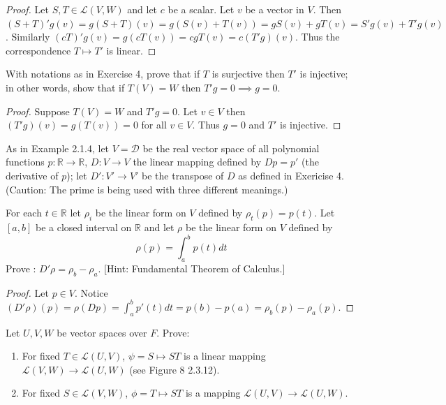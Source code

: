 \begin{proof}
    Let $S, T \in \mathcal{L}(V, W)$ and let $c$ be a scalar.
    Let $v$ be a vector in $V$.
    Then $(S + T)'g(v) = g(S + T)(v) = g(S(v) + T(v)) = gS(v) + gT(v) = S'g(v) + T'g(v)$.
    Similarly $(cT)'g(v) = g(cT(v)) = cgT(v) = c(T'g)(v)$.
    Thus the correspondence $T \mapsto T'$ is linear.
\end{proof}

\begin{tcolorbox}[title=Problem 6, breakable]
    With notations as in Exercise 4, prove that if $T$
    is surjective then $T'$ is injective; in other words,
    show that if $T(V) = W$ then $T'g = 0 \implies g = 0$.
\end{tcolorbox}

\begin{proof}
    Suppose $T(V) = W$ and $T'g = 0$.
    Let $v \in V$ then $(T'g)(v) = g(T(v)) = 0$ for all $v \in V$.
    Thus $g = 0$ and $T'$ is injective. 
\end{proof}

\begin{tcolorbox}[title=Problem 7, breakable]
    As in Example 2.1.4, let $V = \mathcal{D}$ be the real vector 
    space of all polynomial functions $p : \mathbb{R} \longrightarrow \mathbb{R}$,
    $D : V \longrightarrow V$ the linear mapping defined by $Dp = p'$
    (the derivative of $p$); let $D' : V' \longrightarrow V'$
    be the transpose of $D$ as defined in Exericise 4.
    (Caution: The prime is being used with three different meanings.)

    For each $t \in \mathbb{R}$ let $\rho_i$ be the linear form on $V$ 
    defined by $\rho_t(p) = p(t)$. Let $[a, b]$ be a closed interval on $\mathbb{R}$
    and let $\rho$ be the linear form on $V$ defined by 
    \[\rho(p) = \int_a^b p(t) dt\]
    Prove : $D' \rho = \rho_b - \rho_a$.
    [Hint: Fundamental Theorem of Calculus.]
\end{tcolorbox}

\begin{proof}
    Let $p \in V$.
    Notice $(D'\rho)(p) = \rho(Dp) = \int_a^b p'(t) dt = p(b) - p(a) = \rho_b(p) - \rho_a(p)$.
\end{proof}

\begin{tcolorbox}[title=Problem 9, breakable]
    Let $U, V, W$ be vector spaces over $F$. Prove:
    \begin{enumerate}
        \item For fixed $T \in \mathcal{L}(U, V)$, $\psi = S \mapsto ST$ is a linear mapping 
              $\mathcal{L}(V, W) \longrightarrow \mathcal{L}(U, W)$ (see Figure 8 2.3.12).
        \item For fixed $S \in \mathcal{L}(V, W)$, $\phi = T \mapsto ST$ is a mapping $\mathcal{L}(U, V)
                \longrightarrow \mathcal{L}(U, W)$.
    \end{enumerate}
\end{tcolorbox}

